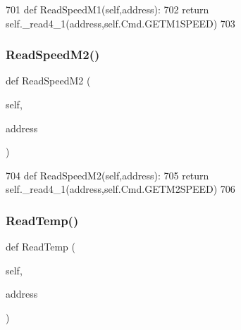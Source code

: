 \begin{DoxyCode}
701     \textcolor{keyword}{def }ReadSpeedM1(self,address):
702         \textcolor{keywordflow}{return} self.\_read4\_1(address,self.Cmd.GETM1SPEED)
703 
\end{DoxyCode}
\mbox{\label{classtoxic__hardware_1_1roboclaw__3_1_1Roboclaw_a9336d97afea54d955d7d241ac930bd18}} 
\subsubsection{\texorpdfstring{Read\+Speed\+M2()}{ReadSpeedM2()}}
{\footnotesize\ttfamily def Read\+Speed\+M2 (\begin{DoxyParamCaption}\item[{}]{self,  }\item[{}]{address }\end{DoxyParamCaption})}


\begin{DoxyCode}
704     \textcolor{keyword}{def }ReadSpeedM2(self,address):
705         \textcolor{keywordflow}{return} self.\_read4\_1(address,self.Cmd.GETM2SPEED)
706 
\end{DoxyCode}
\mbox{\label{classtoxic__hardware_1_1roboclaw__3_1_1Roboclaw_a4d3216ee6c9260f2ebd116bf6c057d0c}} 
\subsubsection{\texorpdfstring{Read\+Temp()}{ReadTemp()}}
{\footnotesize\ttfamily def Read\+Temp (\begin{DoxyParamCaption}\item[{}]{self,  }\item[{}]{address }\end{DoxyParamCaption})}


